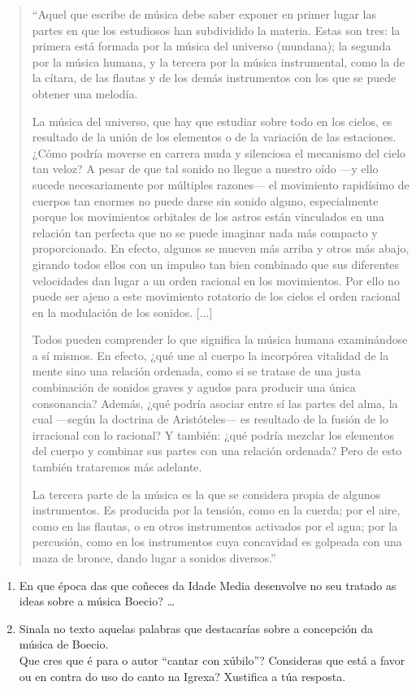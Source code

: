 \begin{quote}
\small{
``Aquel que escribe de música debe saber exponer en primer lugar las partes en que los estudiosos han subdividido la materia. Estas son tres: la primera está formada por la música del universo (mundana); la segunda por la música humana, y la tercera por la música instrumental, como la de la cítara, de las flautas y de los demás instrumentos con los que se puede obtener una melodía.

La música del universo, que hay que estudiar sobre todo en los cielos, es resultado de la unión de los elementos o de la variación de las estaciones. ¿Cómo podría moverse en carrera muda y silenciosa el mecanismo del cielo tan veloz? A pesar de que tal sonido no llegue a nuestro oído —y ello sucede necesariamente por múltiples razones— el movimiento rapidísimo de cuerpos tan enormes no puede darse sin sonido alguno, especialmente porque los movimientos orbitales de los astros están vinculados en una relación tan perfecta que no se puede imaginar nada más compacto y proporcionado. En efecto, algunos se mueven más arriba y otros más abajo, girando todos ellos con un impulso tan bien combinado que sus diferentes velocidades dan lugar a un orden racional en los movimientos. Por ello no puede ser ajeno a este movimiento rotatorio de los cielos el orden racional en la modulación de los sonidos. [...]

Todos pueden comprender lo que significa la música humana examinándose a sí mismos. En efecto, ¿qué une al cuerpo la incorpórea vitalidad de la mente sino una relación ordenada, como si se tratase de una justa combinación de sonidos graves y agudos para producir una única consonancia? Además, ¿qué podría asociar entre sí las partes del alma, la cual —según la doctrina de Aristóteles— es resultado de la fusión de lo irracional con lo racional? Y también: ¿qué podría mezclar los elementos del cuerpo y combinar sus partes con una relación ordenada? Pero de esto también trataremos más adelante.

La tercera parte de la música es la que se considera propia de algunos instrumentos. Es producida por la tensión, como en la cuerda; por el aire, como en las flautas, o en otros instrumentos activados por el agua; por la percusión, como en los instrumentos cuya concavidad es golpeada con una maza de bronce, dando lugar a sonidos diversos.''
}
\end{quote}
%
\begin{ejercicio}
  \begin{enumerate}[1.-]
  \item
    En que época das que coñeces da Idade Media desenvolve no seu tratado as ideas sobre a música Boecio? \ldots
  \item
    Sinala no texto aquelas palabras que destacarías sobre a concepción da música de Boecio. \\
    Que cres que é para o autor ``cantar con xúbilo''? Consideras que está a favor ou en contra do uso do canto na Igrexa? Xustifica a túa resposta.
    \vspace*{3.10cm}
  \end{enumerate}
\end{ejercicio}
